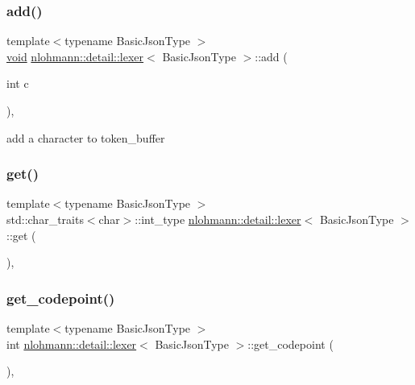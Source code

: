 \subsubsection{\texorpdfstring{add()}{add()}}
{\footnotesize\ttfamily template$<$typename Basic\+Json\+Type $>$ \\
\hyperlink{namespacenlohmann_1_1detail_a59fca69799f6b9e366710cb9043aa77d}{void} \hyperlink{classnlohmann_1_1detail_1_1lexer}{nlohmann\+::detail\+::lexer}$<$ Basic\+Json\+Type $>$\+::add (\begin{DoxyParamCaption}\item[{int}]{c }\end{DoxyParamCaption})\hspace{0.3cm}{\ttfamily [inline]}, {\ttfamily [private]}}



add a character to token\+\_\+buffer 

\mbox{\label{classnlohmann_1_1detail_1_1lexer_a901e45a34e1fb1d97ab62350b0c3ef26}} 
\subsubsection{\texorpdfstring{get()}{get()}}
{\footnotesize\ttfamily template$<$typename Basic\+Json\+Type $>$ \\
std\+::char\+\_\+traits$<$char$>$\+::int\+\_\+type \hyperlink{classnlohmann_1_1detail_1_1lexer}{nlohmann\+::detail\+::lexer}$<$ Basic\+Json\+Type $>$\+::get (\begin{DoxyParamCaption}{ }\end{DoxyParamCaption})\hspace{0.3cm}{\ttfamily [inline]}, {\ttfamily [private]}}

\mbox{\label{classnlohmann_1_1detail_1_1lexer_a820b20e25ff255c3c791c37f2bf48380}} 
\subsubsection{\texorpdfstring{get\+\_\+codepoint()}{get\_codepoint()}}
{\footnotesize\ttfamily template$<$typename Basic\+Json\+Type $>$ \\
int \hyperlink{classnlohmann_1_1detail_1_1lexer}{nlohmann\+::detail\+::lexer}$<$ Basic\+Json\+Type $>$\+::get\+\_\+codepoint (\begin{DoxyParamCaption}{ }\end{DoxyParamCaption})\hspace{0.3cm}{\ttfamily [inline]}, {\ttfamily [private]}}



